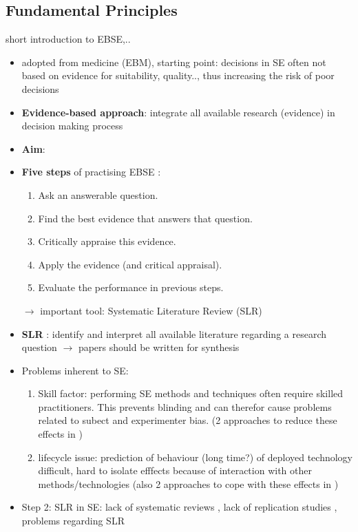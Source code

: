 \subsection{Fundamental Principles}

short introduction to EBSE,..

\begin{itemize}
	\item adopted from medicine (EBM), starting point: decisions in SE often not based on evidence for suitability, quality.., thus increasing the risk of poor decisions 
	\item \textbf{Evidence-based approach}: integrate all available research (evidence) in decision making process
	\item \textbf{Aim}:  \cite{Dyba2005}
	\item \textbf{Five steps} of practising EBSE \cite{EBSE}:
		\begin{enumerate}
			\item Ask an answerable question.
			\item Find the best evidence that answers that question.
			\item Critically appraise this evidence.
			\item Apply the evidence (and critical appraisal).
			\item Evaluate the performance in previous steps.
		\end{enumerate}
		$\rightarrow$ important tool: Systematic Literature Review (SLR)
	\item \textbf{SLR} \cite{keele2007}: identify and interpret all available literature regarding a research question
		$\rightarrow$ papers should be written for synthesis 
	\item Problems inherent to SE\cite{EBSE}:
		\begin{enumerate}
			\item Skill factor: performing SE methods and techniques often require skilled practitioners. This prevents blinding and can therefor cause problems related to subect and experimenter bias. (2 approaches to reduce these effects in \cite{EBSE})
			\item lifecycle issue: prediction of behaviour (long time?) of deployed technology difficult, hard to isolate efffects because of interaction with other methods/technologies (also 2 approaches to cope with these effects in \cite{EBSE})
		\end{enumerate}
		\item Step 2: SLR in SE: lack of systematic reviews , lack of replication studies , problems regarding SLR 
\end{itemize}